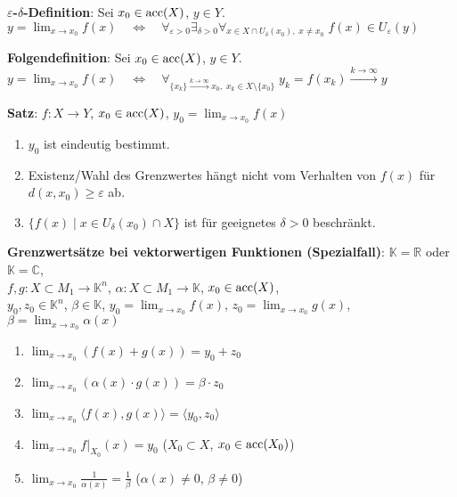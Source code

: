 \textbf{$\varepsilon$-$\delta$-Definition}:
Sei $x_0 \in \operatorname{acc}(X)$, $y \in Y$. \\
$y = \lim_{x \to x_0} f(x) \quad\Leftrightarrow\quad
\forall_{\varepsilon > 0} \exists_{\delta > 0}
\forall_{x \in X \cap U_\delta(x_0),\; x \not= x_0}\;
f(x) \in U_\varepsilon(y)$

\textbf{Folgendefinition}:
Sei $x_0 \in \operatorname{acc}(X)$, $y \in Y$. \\
$y = \lim_{x \to x_0} f(x) \quad\Leftrightarrow\quad
\forall_{\{x_k\} \xrightarrow{k \to \infty} x_0,\;
x_k \in X \setminus \{x_0\}}\;
y_k = f(x_k) \xrightarrow{k \to \infty} y$

\linie

\textbf{Satz}: $f: X \rightarrow Y$,
$x_0 \in \operatorname{acc}(X)$, $y_0 = \lim_{x \to x_0} f(x)$

\begin{enumerate}
    \item $y_0$ ist eindeutig bestimmt.
    
    \item Existenz/Wahl des Grenzwertes hängt nicht vom Verhalten von
    $f(x)$ für $d(x,x_0) \ge \varepsilon$ ab.
    
    \item $\{f(x) \;|\; x \in U_\delta(x_0) \cap X\}$ ist für geeignetes
    $\delta > 0$ beschränkt.
\end{enumerate}

\linie
\pagebreak

\textbf{Grenzwertsätze bei vektorwertigen Funktionen (Spezialfall)}:
$\mathbb{K} = \mathbb{R}$ oder $\mathbb{K} = \mathbb{C}$, \\
$f, g: X \subset M_1 \rightarrow \mathbb{K}^n$, \quad
$\alpha: X \subset M_1 \rightarrow \mathbb{K}$, \quad
$x_0 \in \operatorname{acc}(X)$, \\
$y_0, z_0 \in \mathbb{K}^n$,
$\beta \in \mathbb{K}$, \quad
$y_0 = \lim_{x \to x_0} f(x)$,
$z_0 = \lim_{x \to x_0} g(x)$,
$\beta = \lim_{x \to x_0} \alpha(x)$

\begin{enumerate}
    \item $\lim_{x \to x_0} (f(x) + g(x)) = y_0 + z_0$
    
    \item $\lim_{x \to x_0} (\alpha(x) \cdot g(x)) = \beta \cdot z_0$
    
    \item $\lim_{x \to x_0} \langle f(x), g(x) \rangle =
    \langle y_0, z_0 \rangle$
    
    \item $\lim_{x \to x_0} f|_{X_0}(x) = y_0$ \qquad
    ($X_0 \subset X$, $x_0 \in \operatorname{acc}(X_0)$)
    
    \item $\lim_{x \to x_0} \frac{1}{\alpha(x)} = \frac{1}{\beta}$ \qquad
    ($\alpha(x) \not= 0$, $\beta \not= 0$)
\end{enumerate}

